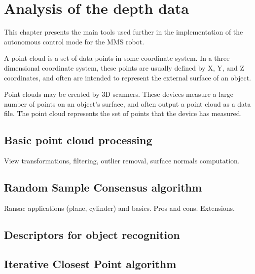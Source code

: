 \chapter{Analysis of the depth data}
\label{cha:analysis}

This chapter presents the main tools used further in the implementation of the autonomous control mode for the MMS robot. 

A point cloud is a set of data points in some coordinate system. In a three-dimensional coordinate system, these points are usually defined by X, Y, and Z coordinates, and often are intended to represent the external surface of an object.

Point clouds may be created by 3D scanners. These devices measure a large number of points on an object's surface, and often output a point cloud as a data file. The point cloud represents the set of points that the device has measured.




\section{Basic point cloud processing}
\label{sec:pointclouds}

View transformations, filtering, outlier removal, surface normals computation.


\section{Random Sample Consensus algorithm}
\label{sec:ransac}

Ransac applications (plane, cylinder) and basics. Pros and cons. Extensions. 


\section{Descriptors for object recognition}
\label{sec:descriptors}



\section{Iterative Closest Point algorithm}
\label{sec:icp}

